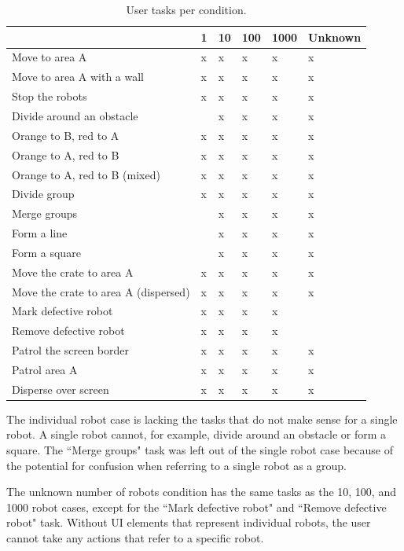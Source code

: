 \begin{table}
\centering
\begin{tabular}{l l l l l l}
	& 1 & 10 & 100 & 1000 & Unknown \\
	\hline
	Move to area A & x & x & x & x & x\\
	Move to area A with a wall & x & x & x & x & x \\
	Stop the robots & x & x & x & x & x\\
	Divide around an obstacle & & x & x & x & x \\
	Orange to B, red to A & x & x & x & x & x \\
	Orange to A, red to B & x & x & x & x & x \\
	Orange to A, red to B (mixed) & x & x & x & x & x \\
	Divide group & x & x & x & x & x \\
	Merge groups & & x & x & x & x \\
	Form a line & & x & x & x & x \\
	Form a square & & x & x & x & x \\
	Move the crate to area A & x & x & x & x & x \\
	Move the crate to area A (dispersed) & x & x & x & x & x\\
	Mark defective robot & x & x & x & x & \\
	Remove defective robot & x & x & x & x &  \\
	Patrol the screen border & x & x & x & x & x \\
	Patrol area A & x & x & x & x & x \\
	Disperse over screen & x & x & x & x & x \\
\end{tabular}
\caption{User tasks per condition.}\label{tab:tasks_per_condition}
\end{table}

The individual robot case is lacking the tasks that do not make sense for a single robot. A single robot cannot, for example, divide around an obstacle or form a square. 
The ``Merge groups" task was left out of the single robot case because of the potential for confusion when referring to a single robot as a group. 

The unknown number of robots condition has the same tasks as the 10, 100, and 1000 robot cases, except for the ``Mark defective robot" and ``Remove defective robot" task. 
Without UI elements that represent individual robots, the user cannot take any actions that refer to a specific robot. 



